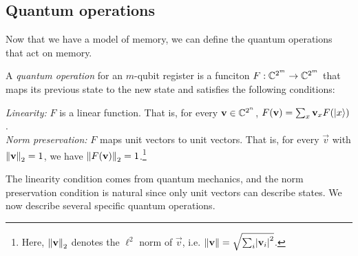 \documentclass[12pt]{article}
\begin{document}
\subsection{Quantum operations}
Now that we have a model of memory, we can define the quantum operations that
act on memory.
\begin{defn}
  \label{defn:op}
  A \emph{quantum operation} for an $m$-qubit register is a funciton $F :
  \CC^{2^m} \to \CC^{2^m}$ that maps its previous state to the new state and
  satisfies the following conditions:
  \begin{adjustwidth}{0.25in}{0in}
    \emph{Linearity:} $F$ is a linear function. That is, for every $\vec{v} \in
    \CC^{2^n}$, $F(\vec{v}) = \sum_x \vec{v}_x F(\reg*{x})$. \\
    \emph{Norm preservation:} $F$ maps unit vectors to unit vectors. That is,
    for every $\vec{v}$ with $\norm*{\vec{v}}_2=1$, we have
    $\norm*{F(\vec{v})}_2=1$.\footnote{Here, $\norm*{\vec{v}}_2$ denotes the
    $\ell^2$ norm of $\vec{v}$, i.e. $\norm*{\vec{v}} = \sqrt{\sum_i
    \abs*{\vec{v}_i}^2}$.}
  \end{adjustwidth}
\end{defn}
The linearity condition comes from quantum mechanics, and the norm preservation
condition is natural since only unit vectors can describe states. We now
describe several specific quantum operations.
\end{document}
